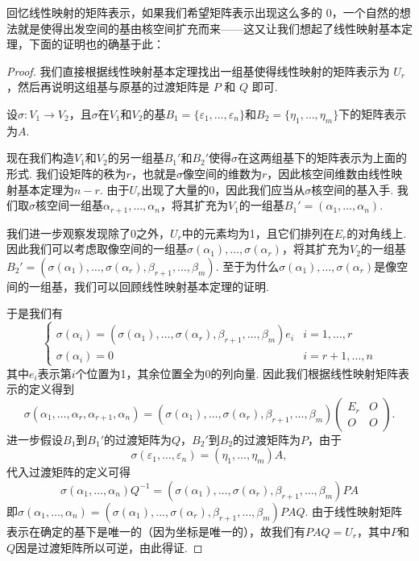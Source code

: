 回忆线性映射的矩阵表示，如果我们希望矩阵表示出现这么多的 $0$，一个自然的想法就是使得出发空间的基由核空间扩充而来——这又让我们想起了线性映射基本定理，下面的证明也的确基于此：

\begin{proof}
    我们直接根据线性映射基本定理找出一组基使得线性映射的矩阵表示为 $U_r$，然后再说明这组基与原基的过渡矩阵是 $P$ 和 $Q$ 即可.

    设$\sigma:V_1\to V_2$，且$\sigma$在$V_1$和$V_2$的基$B_1=\{\varepsilon_1,\ldots,\varepsilon_n\}$和$B_2=\{\eta_1,\ldots,\eta_m\}$下的矩阵表示为$A$.

    现在我们构造$V_1$和$V_2$的另一组基$B_1'$和$B_2'$使得$\sigma$在这两组基下的矩阵表示为上面的形式. 我们设矩阵的秩为$r$，也就是$\sigma$像空间的维数为$r$，因此核空间维数由线性映射基本定理为$n-r$. 由于$U_r$出现了大量的0，因此我们应当从$\sigma$核空间的基入手. 我们取$\sigma$核空间一组基$\alpha_{r+1},\ldots,\alpha_n$，将其扩充为$V_1$的一组基$B_1'=(\alpha_1,\ldots,\alpha_n)$.

    我们进一步观察发现除了0之外，$U_r$中的元素均为1，且它们排列在$E_r$的对角线上. 因此我们可以考虑取像空间的一组基$\sigma(\alpha_1),\ldots,\sigma(\alpha_r)$，将其扩充为$V_2$的一组基$B_2'=(\sigma(\alpha_1),\ldots,\sigma(\alpha_r),\beta_{r+1},\ldots,\beta_m)$. 至于为什么$\sigma(\alpha_1),\ldots,\sigma(\alpha_r)$是像空间的一组基，我们可以回顾线性映射基本定理的证明.

    于是我们有
    \[\begin{cases}
            \sigma(\alpha_i)=(\sigma(\alpha_1),\ldots,\sigma(\alpha_r),\beta_{r+1},\ldots,\beta_m)e_i & i=1,\ldots,r   \\
            \sigma(\alpha_i)=0                                                                        & i=r+1,\ldots,n
        \end{cases}\]
    其中$e_i$表示第$i$个位置为1，其余位置全为0的列向量. 因此我们根据线性映射矩阵表示的定义得到
    \[\sigma(\alpha_1,\ldots,\alpha_r,\alpha_{r+1},\alpha_n)=(\sigma(\alpha_1),\ldots,\sigma(\alpha_r),\beta_{r+1},\ldots,\beta_m)\begin{pmatrix}
            E_r & O \\ O & O
        \end{pmatrix}.\]
    进一步假设$B_1$到$B_1'$的过渡矩阵为$Q$，$B_2'$到$B_2$的过渡矩阵为$P$，由于
    \[\sigma(\varepsilon_1,\ldots,\varepsilon_n)=(\eta_1,\ldots,\eta_m)A,\]
    代入过渡矩阵的定义可得
    \[\sigma(\alpha_1,\ldots,\alpha_n)Q^{-1}=(\sigma(\alpha_1),\ldots,\sigma(\alpha_r),\beta_{r+1},\ldots,\beta_m)PA\]
    即$\sigma(\alpha_1,\ldots,\alpha_n)=(\sigma(\alpha_1),\ldots,\sigma(\alpha_r),\beta_{r+1},\ldots,\beta_m)PAQ$. 由于线性映射矩阵表示在确定的基下是唯一的（因为坐标是唯一的），故我们有$PAQ=U_r$，其中$P$和$Q$因是过渡矩阵所以可逆，由此得证.
\end{proof}

